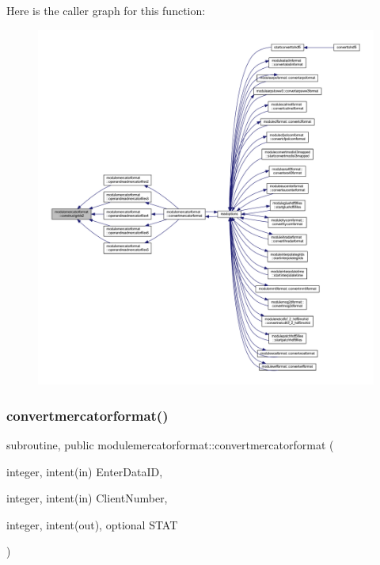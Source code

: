 Here is the caller graph for this function\+:\nopagebreak
\begin{figure}[H]
\begin{center}
\leavevmode
\includegraphics[width=350pt]{namespacemodulemercatorformat_ab1d75b183b32a1b3d634bf12fcf66303_icgraph}
\end{center}
\end{figure}
\mbox{\label{namespacemodulemercatorformat_ab5fa5a32b4c60eb82b51453effd56cbf}} 
\subsubsection{\texorpdfstring{convertmercatorformat()}{convertmercatorformat()}}
{\footnotesize\ttfamily subroutine, public modulemercatorformat\+::convertmercatorformat (\begin{DoxyParamCaption}\item[{integer, intent(in)}]{Enter\+Data\+ID,  }\item[{integer, intent(in)}]{Client\+Number,  }\item[{integer, intent(out), optional}]{S\+T\+AT }\end{DoxyParamCaption})}

